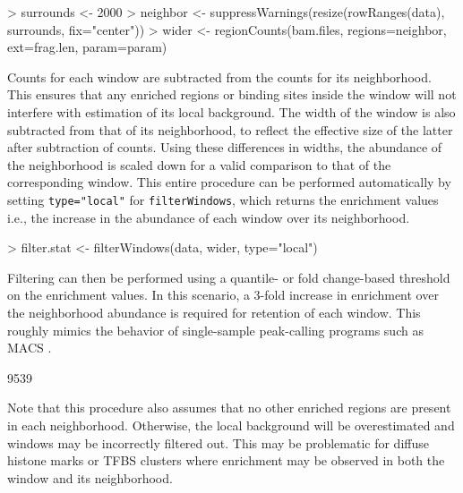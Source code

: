 \documentclass[12pt]{report}
\renewenvironment{Schunk}{\vspace{0pt}}{\vspace{0pt}}
\newcommand{\code}[1]{{\small\texttt{#1}}}
\newcommand{\macs}{MACS}
\begin{document}
\begin{Schunk}
\begin{Sinput}
> surrounds <- 2000
> neighbor <- suppressWarnings(resize(rowRanges(data), surrounds, fix="center"))
> wider <- regionCounts(bam.files, regions=neighbor, ext=frag.len, param=param)
\end{Sinput}
\end{Schunk}

Counts for each window are subtracted from the counts for its neighborhood.
This ensures that any enriched regions or binding sites inside the window will not interfere with estimation of its local background.
The width of the window is also subtracted from that of its neighborhood, to reflect the effective size of the latter after subtraction of counts.
Using these differences in widths, the abundance of the neighborhood is scaled down for a valid comparison to that of the corresponding window.
This entire procedure can be performed automatically by setting \code{type="local"} for \code{filterWindows}, which returns the enrichment values i.e., the increase in the abundance of each window over its neighborhood.

\begin{Schunk}
\begin{Sinput}
> filter.stat <- filterWindows(data, wider, type="local")
\end{Sinput}
\end{Schunk}

Filtering can then be performed using a quantile- or fold change-based threshold on the enrichment values. 
In this scenario, a 3-fold increase in enrichment over the neighborhood abundance is required for retention of each window.
This roughly mimics the behavior of single-sample peak-calling programs such as \macs{} \citep{zhang2008}.

\begin{Schunk}
\begin{Soutput}
[1] 9539
\end{Soutput}
\end{Schunk}

Note that this procedure also assumes that no other enriched regions are present in each neighborhood.
Otherwise, the local background will be overestimated and windows may be incorrectly filtered out. 
This may be problematic for diffuse histone marks or TFBS clusters where enrichment may be observed in both the window and its neighborhood.
\end{document}
